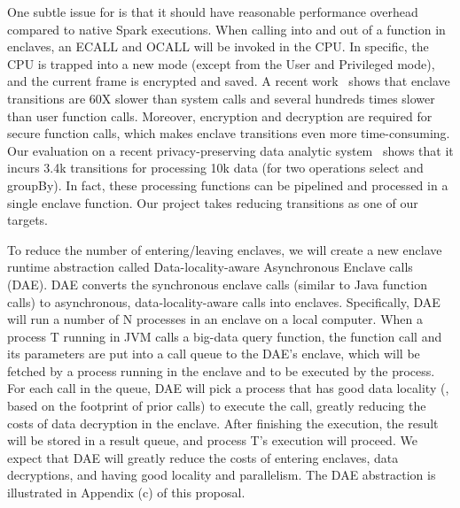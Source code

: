 One subtle issue for \maat is that it should have reasonable performance 
overhead compared to native Spark executions. When calling into and out of a 
function in enclaves, an ECALL and OCALL will be invoked in the CPU. In 
specific, the CPU is trapped into a new mode (except from
the User and Privileged mode), and the current frame is encrypted and saved.
A recent work~\cite{sgxkernel:cf17} shows that enclave transitions are 60X 
slower than system calls and several hundreds times slower than user function 
calls.
Moreover, encryption and decryption are required for secure function calls,
which makes enclave transitions even more time-consuming.
Our evaluation on a recent privacy-preserving data analytic 
system~\cite{opaque:nsdi17} shows that
it incurs 3.4k transitions for processing 10k data (for two operations select 
and groupBy).
In fact, these processing functions can be pipelined and processed in a single
enclave function. Our project takes reducing transitions as one of our targets.




To reduce the number of entering/leaving enclaves, we will create a new 
enclave runtime abstraction called Data-locality-aware Asynchronous Enclave 
calls (DAE). DAE converts the synchronous enclave calls (similar to Java 
function calls) to asynchronous, data-locality-aware calls into enclaves. 
Specifically, DAE will run a number of N processes in an enclave on a local 
computer. When a process T running in JVM calls a big-data query function, the 
function call and its parameters are put into a call queue to the DAE's enclave, 
which will be fetched by a process running in the enclave and to be executed by 
the process. For each call in the queue, DAE will pick a process that 
has good data locality (\eg, based on the footprint of prior calls) to execute 
the call, greatly reducing the costs of data decryption in the enclave. After 
finishing the execution, the result will be stored in a result queue, and 
process T's execution will proceed. We expect that DAE will greatly reduce the 
costs of entering enclaves, data decryptions, and having good locality and 
parallelism. The DAE abstraction is illustrated in Appendix (c) of this 
proposal.

